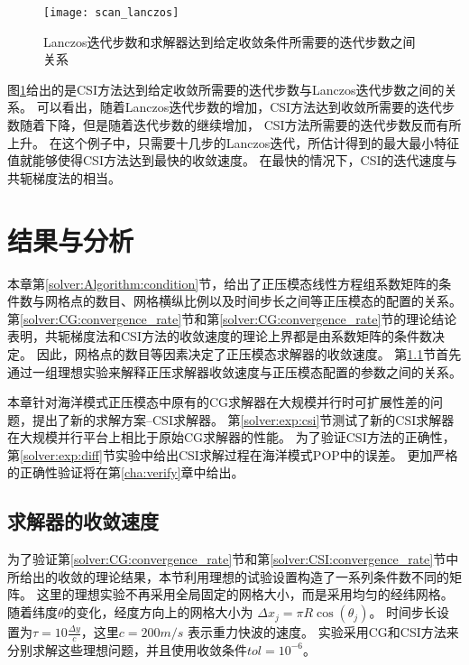\begin {figure}[htbp]
\centering
\texttt{[image: scan\_lanczos]}
\caption[] {Lanczos迭代步数和求解器达到给定收敛条件所需要的迭代步数之间关系\label{fig:lanczos_iter}}
\end{figure}
图\ref{fig:lanczos_iter}给出的是CSI方法达到给定收敛所需要的迭代步数与Lanczos迭代步数之间的关系。
可以看出，随着Lanczos迭代步数的增加，CSI方法达到收敛所需要的迭代步数随着下降，但是随着迭代步数的继续增加， CSI方法所需要的迭代步数反而有所上升。 
在这个例子中，只需要十几步的Lanczos迭代，所估计得到的最大最小特征值就能够使得CSI方法达到最快的收敛速度。
在最快的情况下，CSI的迭代速度与共轭梯度法的相当。


\section{结果与分析} 
\label{solver:exp}

本章第\ref{solver:Algorithm:condition}节，给出了正压模态线性方程组系数矩阵的条件数与网格点的数目、网格横纵比例以及时间步长之间等正压模态的配置的关系。
第\ref{solver:CG:convergence_rate}节和第\ref{solver:CG:convergence_rate}节的理论结论表明，共轭梯度法和CSI方法的收敛速度的理论上界都是由系数矩阵的条件数决定。
因此，网格点的数目等因素决定了正压模态求解器的收敛速度。
第\ref{solver:exp:ideal}节首先通过一组理想实验来解释正压求解器收敛速度与正压模态配置的参数之间的关系。 

本章针对海洋模式正压模态中原有的CG求解器在大规模并行时可扩展性差的问题，提出了新的求解方案--CSI求解器。
第\ref{solver:exp:csi}节测试了新的CSI求解器在大规模并行平台上相比于原始CG求解器的性能。
为了验证CSI方法的正确性，第\ref{solver:exp:diff}节实验中给出CSI求解过程在海洋模式POP中的误差。
更加严格的正确性验证将在第\ref{cha:verify}章中给出。 



\subsection{求解器的收敛速度}\label{solver:exp:ideal}

为了验证第\ref{solver:CG:convergence_rate}节和第\ref{solver:CSI:convergence_rate}节中所给出的收敛的理论结果，本节利用理想的试验设置构造了一系列条件数不同的矩阵。
这里的理想实验不再采用全局固定的网格大小，而是采用均匀的经纬网格。
随着纬度$\theta$的变化，经度方向上的网格大小为 $\Delta x_j  = \pi R \cos (\theta_j)$。
时间步长设置为$\tau = 10\frac{\Delta y}{c}$，这里$c = 200m/s$ 表示重力快波的速度\cite{smith2010parallel}。 
实验采用CG和CSI方法来分别求解这些理想问题，并且使用收敛条件$tol = 10^{-6}$。 
  

